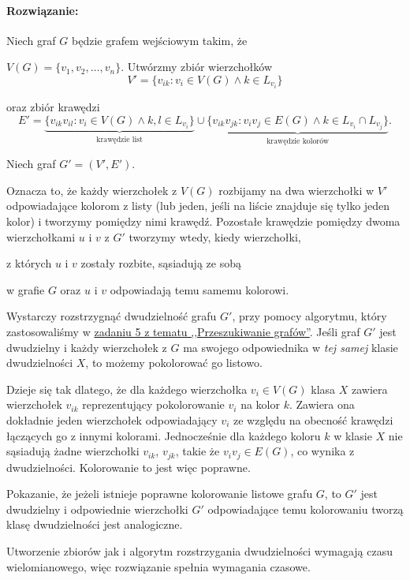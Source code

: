 \paragraph{Rozwiązanie:} 

Niech graf $G$ będzie grafem wejściowym takim, że

$V(G) = \{v_1, v_2, \ldots, v_n\}$. 
Utwórzmy zbiór wierzchołków
\[V' = \{v_{ik} : v_i\in V(G) \land k \in L_{v_i}\}\]


oraz zbiór krawędzi 
\[E' = \underbrace{\{v_{ik}v_{il} : v_i \in V(G) \land k, l \in L_{v_i}\}}_\text{krawędzie list} \cup 
\underbrace{\{v_{ik}v_{jk} : v_iv_j \in E(G) \land k\in L_{v_i} \cap L_{v_j}\}}_\text{krawędzie kolorów}.\]

Niech graf $G' = (V', E')$. 

Oznacza to, że każdy wierzchołek z $V(G)$ rozbijamy na dwa wierzchołki w $V'$ odpowiadające kolorom z listy (lub jeden, jeśli na liście znajduje się tylko jeden kolor) i tworzymy pomiędzy 
nimi krawędź. Pozostałe krawędzie pomiędzy dwoma wierzchołkami
$u$ i $v$ z $G'$ tworzymy wtedy, kiedy wierzchołki,

z których $u$ i $v$ zostały rozbite, sąsiadują ze sobą

w grafie $G$ oraz $u$ i $v$ odpowiadają temu samemu kolorowi. 

Wystarczy rozstrzygnąć dwudzielność 
grafu $G'$, przy pomocy algorytmu, który zastosowaliśmy w \hyperref[exc:bipart]{zadaniu 5 z tematu ,,Przeszukiwanie grafów''}. Jeśli graf $G'$ jest dwudzielny i każdy wierzchołek z $G$ ma swojego odpowiednika w \emph{tej samej} klasie dwudzielności $X$, to możemy pokolorować go listowo.

Dzieje się tak dlatego, że dla każdego wierzchołka $v_i\in V(G)$ klasa $X$ zawiera wierzchołek $v_{ik}$ reprezentujący pokolorowanie $v_i$ na kolor $k$. Zawiera ona dokładnie jeden wierzchołek odpowiadający $v_i$ ze względu na obecność krawędzi łączących go z innymi kolorami. Jednocześnie dla każdego koloru $k$ w klasie $X$ nie sąsiadują żadne wierzchołki $v_{ik}$, $v_{jk}$, takie że $v_iv_j\in E(G)$, co wynika z dwudzielności. Kolorowanie to jest więc poprawne.

Pokazanie, że jeżeli istnieje poprawne kolorowanie listowe grafu $G$, to $G'$ jest dwudzielny i odpowiednie wierzchołki $G'$ odpowiadające temu kolorowaniu tworzą klasę dwudzielności jest analogiczne. 

Utworzenie zbiorów jak i algorytm rozstrzygania dwudzielności wymagają czasu wielomianowego, więc rozwiązanie spełnia wymagania czasowe.

